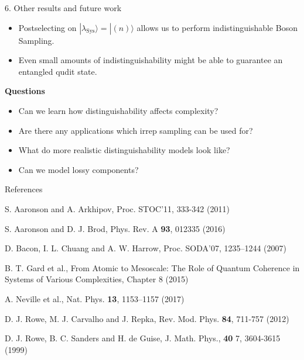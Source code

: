 \documentclass[]{templates/poster}
\begin{document}
\begin{frame}{}
\begin{columns}[t]
\begin{column}{0.422\linewidth}
  \begin{block}{\Large 6. Other results and future work}
  \begin{itemize}
  \item Postselecting on $|\lambda_{\textrm{Sys}}\rangle = |(n)\rangle$ allows us to perform indistinguishable Boson Sampling.
  \item Even small amounts of indistinguishability might be able to guarantee an entangled qudit state.
  \end{itemize}
  \textbf{Questions}
  \begin{itemize}
  \item Can we learn how distinguishability affects complexity?
  \item Are there any applications which irrep sampling can be used for?
  \item What do more realistic distinguishability models look like?
  \item Can we model lossy components?
  \end{itemize}
  \end{block}

  \begin{block}{\Large References}
  
  \noindent [AA11] S. Aaronson and A. Arkhipov, Proc. STOC'11, 333-342 (2011)
  
  \noindent [AB16] S. Aaronson and D. J. Brod, Phys. Rev. A \textbf{93}, 012335 (2016)

  
  \noindent [BCH07] D. Bacon, I. L. Chuang and A. W. Harrow, Proc. SODA'07, 1235--1244 (2007)
  
  \noindent [GMO+15] B. T. Gard et al., From Atomic to Mesoscale: The Role of Quantum Coherence in Systems of Various Complexities, Chapter 8 (2015)
  
  \noindent [NSC+17] A. Neville et al., Nat. Phys. \textbf{13}, 1153–1157 (2017)
  
  \noindent [RCR12] D. J. Rowe, M. J. Carvalho and J. Repka, Rev. Mod. Phys. \textbf{84}, 711-757 (2012)
   
  \noindent [RSdG99] D. J. Rowe, B. C. Sanders and H. de Guise, J. Math. Phys., \textbf{40} 7, 3604-3615 (1999)
  \end{block}
  \end{column}
\end{columns}

\end{frame}

\end{document}
